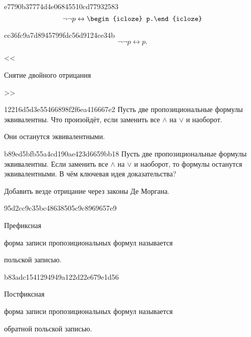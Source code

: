\begin{note}{e7790b37774d4e06845510cd77932583}
    \[
        \lnot \lnot p \leftrightarrow \begin{icloze}{1}p.\end{icloze}
    \]
\end{note}

\begin{note}{cc36fc9a7d8945799fdc56d9124ce34b}
    \[
        \lnot \lnot p \leftrightarrow p.
    \]

    \begin{center}
        \tiny
        <<\begin{icloze}{1}Снятие двойного отрицания\end{icloze}>>
    \end{center}
\end{note}

\begin{note}{12216d5d3e55466898f2f6ea416667e2}
    Пусть две пропозициональные формулы эквивалентны. Что произойдёт, если заменить все \({ \land }\) на \({ \lor }\) и наоборот.

    \begin{cloze}{1}
        Они останутся эквивалентными.
    \end{cloze}
\end{note}

\begin{note}{b89ed5bfb55a4cd190ae423d6659bb18}
    Пусть две пропозициональные формулы эквивалентны. Если заменить все \({ \land }\) на \({ \lor }\) и наоборот, то формулы останутся эквивалентными.
    В чём ключевая идея доказательства?

    \begin{cloze}{1}
        Добавить везде отрицание через законы Де Моргана.
    \end{cloze}
\end{note}

\begin{note}{95d2cc9c35bc48638505c9c8969657e9}
    \begin{icloze}{2}Префиксная\end{icloze} форма записи пропозициональных формул называется \begin{icloze}{1}польской записью.\end{icloze}
\end{note}

\begin{note}{b83adc1541294949a122d22e679e1d56}
    \begin{icloze}{2}Постфиксная\end{icloze} форма записи пропозициональных формул называется \begin{icloze}{1}обратной польской записью.\end{icloze}
\end{note}

